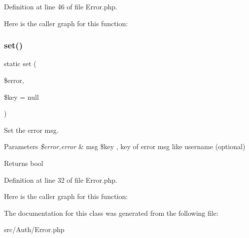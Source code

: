 Definition at line 46 of file Error.\+php.

Here is the caller graph for this function\+:
\mbox{\label{class_zest_1_1_auth_1_1_error_af8908a25550c971e719a2243b130d80b}} 
\subsubsection{\texorpdfstring{set()}{set()}}
{\footnotesize\ttfamily static set (\begin{DoxyParamCaption}\item[{}]{\$error,  }\item[{}]{\$key = {\ttfamily null} }\end{DoxyParamCaption})\hspace{0.3cm}{\ttfamily [static]}}

Set the error msg.


\begin{DoxyParams}{Parameters}
{\em \$error,error} & msg \$key , key of error msg like username (optional)\\
\hline
\end{DoxyParams}
\begin{DoxyReturn}{Returns}
bool 
\end{DoxyReturn}


Definition at line 32 of file Error.\+php.

Here is the caller graph for this function\+:


The documentation for this class was generated from the following file\+:\begin{DoxyCompactItemize}
\item 
src/\+Auth/Error.\+php\end{DoxyCompactItemize}
